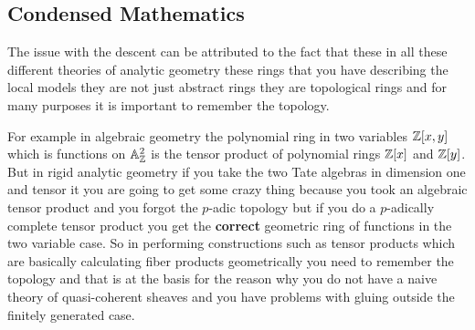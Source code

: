 

\subsection{Condensed Mathematics}

 The issue with the descent can be attributed to the fact that these in all these different theories of analytic geometry these 
 rings that you have describing the local models they are  not just abstract rings they are  topological rings and for many purposes 
 it is important to remember the topology.

 For example in algebraic geometry the polynomial ring in two variables $\Bbb{Z}[x,y]$ which is functions on 
 $\Bbb{A}^{2}_{\Bbb{Z}}$ is the tensor product of polynomial rings $\Bbb{Z}[x]$ and $\Bbb{Z}[y]$. But in rigid analytic geometry 
 if you take the two Tate algebras in dimension one and tensor it you are going to get some crazy thing because you took an 
 algebraic tensor product and you forgot the $p$-adic topology but if you do a $p$-adically complete tensor product 
 you get the \textbf{correct} geometric ring of functions in the two variable case. So in performing constructions 
 such as tensor products which are basically calculating fiber products geometrically you need to remember the 
 topology and that is at the basis for the reason why you do not have a naive theory of quasi-coherent sheaves and you 
 have problems with gluing outside the finitely generated case.

